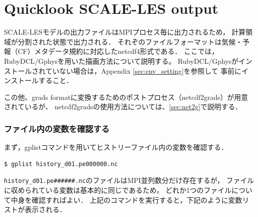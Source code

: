 \section{Quicklook SCALE-LES output}
\label{sec:quicklook}

SCALE-LESモデルの出力ファイルはMPIプロセス毎に出力されるため，
計算領域が分割された状態で出力される．
それぞのファイルフォーマットは気候・予報（CF）メタデータ規約に対応したnetcdf4形式である．
ここでは，RubyDCL/Gphysを用いた描画方法について説明する。
RubyDCL/Gphysがインストールされていない場合は，Appendix \ref{sec:env_setting}を参照して
事前にインストールすること．

この他、grads formatに変換するためのポストプロセス（netcdf2grads）が用意されているが、
netcdf2gradsの使用方法については、\ref{sec:net2g}で説明する．


\subsubsection{ファイル内の変数を確認する}

まず，gplistコマンドを用いてヒストリーファイル内の変数を確認する．

\begin{verbatim}
$ gplist history_d01.pe000000.nc
\end{verbatim}

\verb|history_d01.pe######.nc|のファイルはMPI並列数分だけ存在するが，
ファイルに収められている変数は基本的に同じであるため，
どれか1つのファイルについて中身を確認すればよい．
上記のコマンドを実行すると，下記のように変数リストが表示される．

